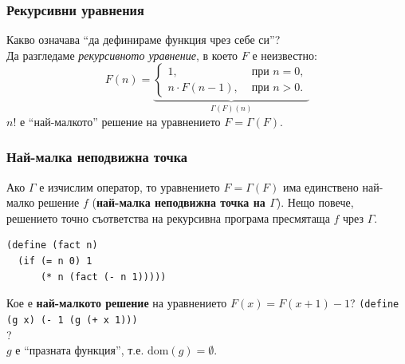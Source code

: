 \documentclass[alsotrans]{beamerswitch}
\begin{document}
\begin{frame}
  \frametitle{Рекурсивни уравнения}

  Какво означава ``да дефинираме функция чрез себе си''?\\[2ex]
  \pause
  Да разгледаме \emph{рекурсивното уравнение}, в което $F$ е неизвестно:
  \begin{equation*}
    F(n) =
    \underbrace{\begin{cases}
      1,&\text{ при }n = 0,\\
      n \cdot F(n-1),&\text{ при }n > 0.
    \end{cases}}_{\Gamma(F)(n)}
  \end{equation*}
  \pause
  \alert{$n!$ е ``най-малкото'' решение на уравнението $F = \Gamma(F)$.}
\end{frame}

\begin{frame}[fragile]
  \frametitle{Най-малка неподвижна точка}

  \begin{theorem}
    Ако $\Gamma$ е изчислим оператор, то уравнението $F = \Gamma(F)$ има единствено най-малко решение $f$ \pause (\textbf{най-малка неподвижна точка на $\Gamma$}). \pause Нещо повече, решението точно съответства на рекурсивна програма пресмятаща $f$ чрез $\Gamma$.
  \end{theorem}
  \pause
\begin{lstlisting}
(define (fact n)
  (if (= n 0) 1
      (* n (fact (- n 1)))))
\end{lstlisting}
  \pause
  Кое е \textbf{най-малкото решение} на уравнението $F(x) = F(x+1) - 1$?
  \pause
\lstinline{(define (g x) (- 1 (g (+ x 1)))}\\
?\\
  \pause
  $g$ е ``празната функция'', т.е. $\mathrm{dom}(g) = \emptyset$.
\end{frame}
\end{document}
